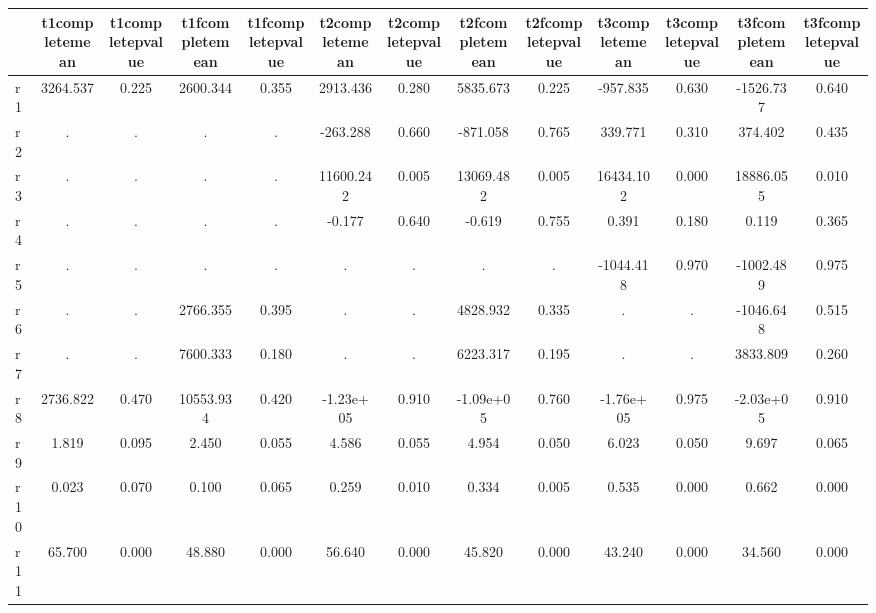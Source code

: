 \begin{table}[htbp]
\begin{tabular}{lcccccccccccc} \hline \hline
 & t1completemean  & t1completepvalue  & t1fcompletemean  & t1fcompletepvalue  & t2completemean  & t2completepvalue  & t2fcompletemean  & t2fcompletepvalue  & t3completemean  & t3completepvalue  & t3fcompletemean  & t3fcompletepvalue  \\  \hline 
r1 &  3264.537 &     0.225 &  2600.344 &     0.355 &  2913.436 &     0.280 &  5835.673 &     0.225 &  -957.835 &     0.630 & -1526.737 &     0.640 \\  
r2 &         . &         . &         . &         . &  -263.288 &     0.660 &  -871.058 &     0.765 &   339.771 &     0.310 &   374.402 &     0.435 \\  
r3 &         . &         . &         . &         . & 11600.242 &     0.005 & 13069.482 &     0.005 & 16434.102 &     0.000 & 18886.055 &     0.010 \\  
r4 &         . &         . &         . &         . &    -0.177 &     0.640 &    -0.619 &     0.755 &     0.391 &     0.180 &     0.119 &     0.365 \\  
r5 &         . &         . &         . &         . &         . &         . &         . &         . & -1044.418 &     0.970 & -1002.489 &     0.975 \\  
r6 &         . &         . &  2766.355 &     0.395 &         . &         . &  4828.932 &     0.335 &         . &         . & -1046.648 &     0.515 \\  
r7 &         . &         . &  7600.333 &     0.180 &         . &         . &  6223.317 &     0.195 &         . &         . &  3833.809 &     0.260 \\  
r8 &  2736.822 &     0.470 & 10553.934 &     0.420 & -1.23e+05 &     0.910 & -1.09e+05 &     0.760 & -1.76e+05 &     0.975 & -2.03e+05 &     0.910 \\  
r9 &     1.819 &     0.095 &     2.450 &     0.055 &     4.586 &     0.055 &     4.954 &     0.050 &     6.023 &     0.050 &     9.697 &     0.065 \\  
r10 &     0.023 &     0.070 &     0.100 &     0.065 &     0.259 &     0.010 &     0.334 &     0.005 &     0.535 &     0.000 &     0.662 &     0.000 \\  
r11 &    65.700 &     0.000 &    48.880 &     0.000 &    56.640 &     0.000 &    45.820 &     0.000 &    43.240 &     0.000 &    34.560 &     0.000 \\  
\hline \hline \end{tabular}
\end{table}
